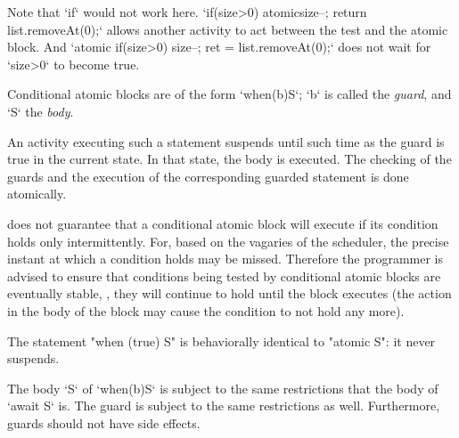 Note that \xcd`if` would not work here.  
\xcd`if(size>0) atomic{size--; return list.removeAt(0);}` allows another
activity to act between the test and the atomic block.  
And 
\xcd`atomic{ if(size>0) {size--; ret = list.removeAt(0);}}` 
does not wait for \xcd`size>0` to become true.


Conditional atomic blocks are of the form \xcd`when(b)S`; 
\xcd`b` is called the {\em guard}, and \xcd`S` the {\em body}.

An activity executing such a statement suspends until such time as the  guard
is true in the current state. In that state, the 
body is executed. 
The checking of the guards and the execution of the corresponding
guarded statement is done atomically. 

\Xten{} does not guarantee that a conditional atomic block
will execute if its condition holds only intermittently. For, based on
the vagaries of the scheduler, the precise instant at which a
condition holds may be missed. Therefore the programmer is advised to
ensure that conditions being tested by conditional atomic blocks are
eventually stable, \ie, they will continue to hold until the block
executes (the action in the body of the block may cause the condition
to not hold any more).




The statement \xcd"when (true) S" is
behaviorally identical to \xcd"atomic S": it never suspends.

The body \xcd`S` of \xcd`when(b)S` is subject to the same restrictions that
the body of \xcd`await S` is.  The guard is subject to the same restrictions
as well.  Furthermore, guards should not have side effects.


